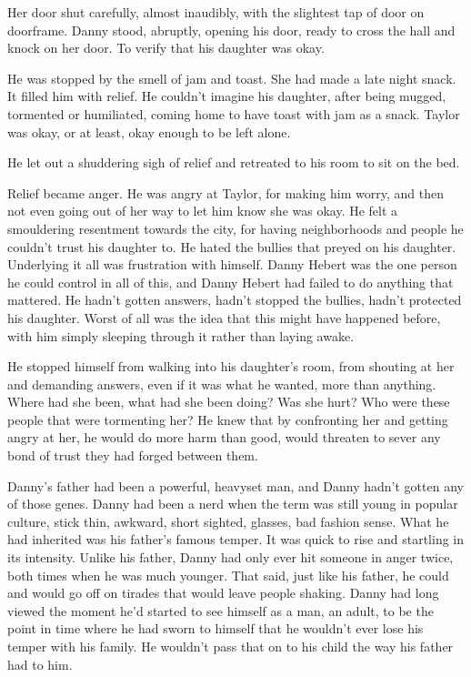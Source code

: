 Her door shut carefully, almost inaudibly, with the slightest tap of door on doorframe.  Danny stood, abruptly, opening his door, ready to cross the hall and knock on her door.  To verify that his daughter was okay.



He was stopped by the smell of jam and toast.  She had made a late night snack.  It filled him with relief.  He couldn't imagine his daughter, after being mugged, tormented or humiliated, coming home to have toast with jam as a snack.  Taylor was okay, or at least, okay enough to be left alone.



He let out a shuddering sigh of relief and retreated to his room to sit on the bed.



Relief became anger.  He was angry at Taylor, for making him worry, and then not even going out of her way to let him know she was okay.  He felt a smouldering resentment towards the city, for having neighborhoods and people he couldn't trust his daughter to.  He hated the bullies that preyed on his daughter.  Underlying it all was frustration with himself.  Danny Hebert was the one person he could control in all of this, and Danny Hebert had failed to do anything that mattered.  He hadn't gotten answers, hadn't stopped the bullies, hadn't protected his daughter.  Worst of all was the idea that this might have happened before, with him simply sleeping through it rather than laying awake.



He stopped himself from walking into his daughter's room, from shouting at her and demanding answers, even if it was what he wanted, more than anything.  Where had she been, what had she been doing?  Was she hurt?  Who were these people that were tormenting her?  He knew that by confronting her and getting angry at her, he would do more harm than good, would threaten to sever any bond of trust they had forged between them.



Danny's father had been a powerful, heavyset man, and Danny hadn't gotten any of those genes.  Danny had been a nerd when the term was still young in popular culture, stick thin, awkward, short sighted, glasses, bad fashion sense.  What he had inherited was his father's famous temper.  It was quick to rise and startling in its intensity.  Unlike his father, Danny had only ever hit someone in anger twice, both times when he was much younger.  That said, just like his father, he could and would go off on tirades that would leave people shaking.  Danny had long viewed the moment he'd started to see himself as a man, an adult, to be the point in time where he had sworn to himself that he wouldn't ever lose his temper with his family.  He wouldn't pass that on to his child the way his father had to him.



